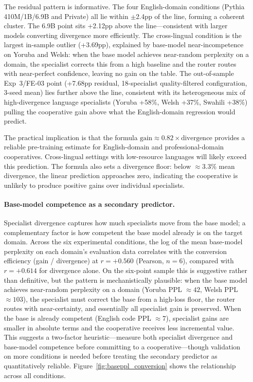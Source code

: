 \documentclass{article}
\begin{document}
The residual pattern is informative. The four English-domain conditions (Pythia 410M/1B/6.9B and Private) all lie within $\pm$2.4pp of the line, forming a coherent cluster. The 6.9B point sits +2.12pp above the line---consistent with larger models converting divergence more efficiently. The cross-lingual condition is the largest in-sample outlier (+3.69pp), explained by base-model near-incompetence on Yoruba and Welsh: when the base model achieves near-random perplexity on a domain, the specialist corrects this from a high baseline and the router routes with near-perfect confidence, leaving no gain on the table. The out-of-sample Exp~3/FE-03 point (+7.68pp residual, 18-specialist quality-filtered configuration, 3-seed mean) lies further above the line, consistent with its heterogeneous mix of high-divergence language specialists (Yoruba +58\%, Welsh +37\%, Swahili +38\%) pulling the cooperative gain above what the English-domain regression would predict.

The practical implication is that the formula $\text{gain} \approx 0.82 \times \text{divergence}$ provides a reliable pre-training estimate for English-domain and professional-domain cooperatives. Cross-lingual settings with low-resource languages will likely exceed this prediction. The formula also sets a divergence floor: below $\approx$3.3\% mean divergence, the linear prediction approaches zero, indicating the cooperative is unlikely to produce positive gains over individual specialists.

\paragraph{Base-model competence as a secondary predictor.}
Specialist divergence captures how much specialists move from the base model; a complementary factor is how competent the base model already is on the target domain. Across the six experimental conditions, the log of the mean base-model perplexity on each domain's evaluation data correlates with the conversion efficiency (gain / divergence) at $r = +0.560$ (Pearson, $n = 6$), compared with $r = +0.614$ for divergence alone. On the six-point sample this is suggestive rather than definitive, but the pattern is mechanistically plausible: when the base model achieves near-random perplexity on a domain (Yoruba PPL $\approx 42$, Welsh PPL $\approx 103$), the specialist must correct the base from a high-loss floor, the router routes with near-certainty, and essentially all specialist gain is preserved. When the base is already competent (English code PPL $\approx 7$), specialist gains are smaller in absolute terms and the cooperative receives less incremental value. This suggests a two-factor heuristic---measure both specialist divergence and base-model competence before committing to a cooperative---though validation on more conditions is needed before treating the secondary predictor as quantitatively reliable. Figure~\ref{fig:baseppl_conversion} shows the relationship across all conditions.
\end{document}

